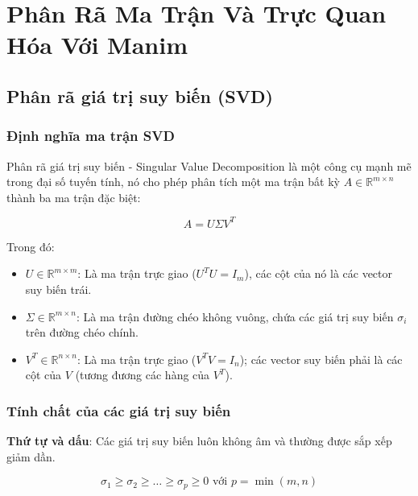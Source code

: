 \chapter{Phân Rã Ma Trận Và Trực Quan Hóa Với Manim}

\newpage

\section{Phân rã giá trị suy biến (SVD)}

\subsection{Định nghĩa ma trận SVD}

Phân rã giá trị suy biến - Singular Value Decomposition là một công cụ mạnh mẽ trong đại số tuyến tính, nó cho phép phân tích một ma trận bất kỳ $A \in \mathbb{R}^{m \times n}$ thành ba ma trận đặc biệt:

{
\begin{equation}
    A = U \Sigma V^T
\end{equation}
}

Trong đó:

\begin{itemize}[topsep=0pt, itemsep=2.5pt, leftmargin=1.5cm]
    \item $U \in \mathbb{R}^{m \times m}$: Là ma trận trực giao ($U^TU=I_{m}$), các cột của nó là các vector suy biến trái.
    \item $\Sigma \in \mathbb{R}^{m \times n}$: Là ma trận đường chéo không vuông, chứa các giá trị suy biến $\sigma_{i}$ trên đường chéo chính.
    \item $V^T \in \mathbb{R}^{n \times n}$: Là ma trận trực giao ($V^TV = I_{n}$); các vector suy biến phải là các cột của $V$ (tương đương các hàng của $V^T$).
\end{itemize}

\subsection{Tính chất của các giá trị suy biến}

\textbf{Thứ tự và dấu}: Các giá trị suy biến luôn không âm và thường được sắp xếp giảm dần.

\begin{equation}
    \sigma_1 \geq \sigma_2 \geq \dots \geq \sigma_p \geq 0 \text{ với } p = \min(m, n)
\end{equation}

